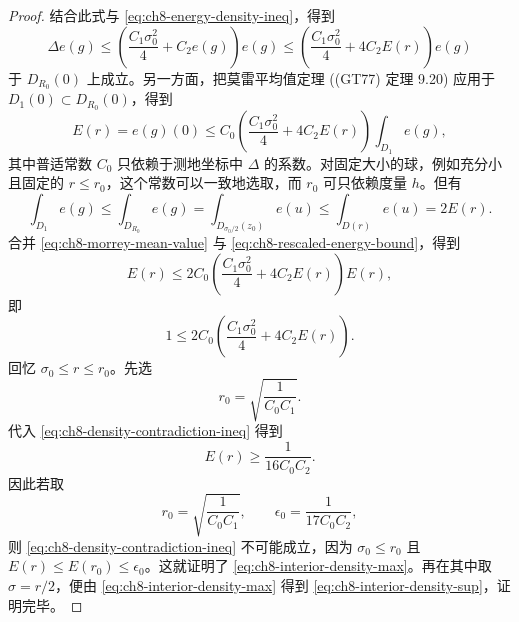 \begin{proof}
结合此式与 \eqref{eq:ch8-energy-density-ineq}，得到
\[
 \Delta e(g)\leq
 \left(\frac{C_1\sigma_0^2}{4}+C_2e(g)\right)e(g)
 \leq\left(\frac{C_1\sigma_0^2}{4}+4C_2E(r)\right)e(g)
\]
于 $D_{R_0}(0)$ 上成立。另一方面，把莫雷平均值定理
((GT77) 定理 9.20) 应用于 $D_1(0)\subset D_{R_0}(0)$，得到
\begin{equation}
 E(r)=e(g)(0)\leq C_0
 \left(\frac{C_1\sigma_0^2}{4}+4C_2E(r)\right)
 \int_{D_1}e(g),
 \label{eq:ch8-morrey-mean-value}
\end{equation}
其中普适常数 $C_0$ 只依赖于测地坐标中 $\Delta$ 的系数。对固定大小的球，例如充分小且固定的 $r\leq r_0$，这个常数可以一致地选取，而 $r_0$ 可只依赖度量 $h$。但有
\begin{equation}
 \int_{D_1}e(g)\leq\int_{D_{R_0}}e(g)
 =\int_{D_{\sigma_0/2}(z_0)}e(u)
 \leq\int_{D(r)}e(u)=2E(r).
 \label{eq:ch8-rescaled-energy-bound}
\end{equation}
合并 \eqref{eq:ch8-morrey-mean-value} 与
\eqref{eq:ch8-rescaled-energy-bound}，得到
\[
 E(r)\leq2C_0\left(\frac{C_1\sigma_0^2}{4}+4C_2E(r)\right)E(r),
\]
即
\begin{equation}
 1\leq2C_0\left(\frac{C_1\sigma_0^2}{4}+4C_2E(r)\right).
 \label{eq:ch8-density-contradiction-ineq}
\end{equation}
回忆 $\sigma_0\leq r\leq r_0$。先选
\begin{equation}
 r_0=\sqrt{\frac1{C_0C_1}}.
 \label{eq:ch8-density-r0-choice}
\end{equation}
代入 \eqref{eq:ch8-density-contradiction-ineq} 得到
\begin{equation}
 E(r)\geq\frac1{16C_0C_2}.
 \label{eq:ch8-density-energy-lower}
\end{equation}
因此若取
\[
 r_0=\sqrt{\frac1{C_0C_1}},\qquad
 \epsilon_0=\frac1{17C_0C_2},
\]
则 \eqref{eq:ch8-density-contradiction-ineq} 不可能成立，因为
$\sigma_0\leq r_0$ 且 $E(r)\leq E(r_0)\leq\epsilon_0$。这就证明了
\eqref{eq:ch8-interior-density-max}。再在其中取 $\sigma=r/2$，便由
\eqref{eq:ch8-interior-density-max} 得到
\eqref{eq:ch8-interior-density-sup}，证明完毕。
\end{proof}
